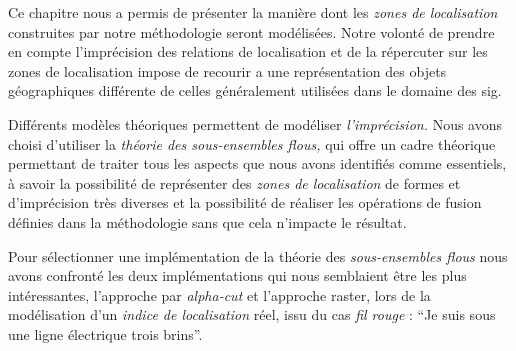 Ce chapitre nous a permis de présenter la manière dont les \emph{zones de localisation} construites par notre méthodologie seront modélisées. Notre volonté de prendre en compte l'imprécision des relations de localisation et de la répercuter sur les zones de localisation impose de recourir a une représentation des objets géographiques différente de celles généralement utilisées dans le domaine des \ac{sig}.

Différents modèles théoriques permettent de modéliser \emph{l'imprécision.} Nous avons choisi d'utiliser la \emph{théorie des sous-ensembles flous,} qui offre un cadre théorique permettant de traiter tous les aspects que nous avons identifiés comme essentiels, à savoir la possibilité de représenter des \emph{zones de localisation} de formes et d'imprécision très diverses et la possibilité de réaliser les opérations de fusion définies dans la méthodologie sans que cela n'impacte le résultat.

Pour sélectionner une implémentation de la théorie des \emph{sous-ensembles flous} nous avons confronté les deux implémentations qui nous semblaient être les plus intéressantes, l'approche par \emph{alpha-cut} et l'approche raster, lors de la modélisation d'un \emph{indice de localisation} réel, issu du cas \emph{fil rouge} : \enquote{Je suis sous une ligne électrique trois brins}.



